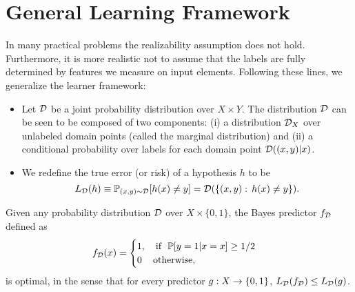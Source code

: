 \documentclass[11pt,a4paper]{article}
\begin{document}
\section{General Learning Framework}

In many practical problems the realizability assumption does not hold. Furthermore, it is more realistic not to assume that the labels are fully determined by features we measure on input elements. Following these lines, we generalize the learner framework:

\begin{itemize}
\item {} Let $\mathcal{D}$ be a joint probability distribution over $X\times Y$. The distribution $\mathcal{D}$ can be seen to be composed of two components: (i) a distribution $\mathcal{D}_X$ over unlabeled domain points (called the marginal distribution) and (ii) a conditional probability over labels for each domain point $\mathcal{D}((x,y)|x)$.

\item {} We redefine the true error (or risk) of a hypothesis $h$ to be
\begin{equation*}
L_{\mathcal{D}} (h) \equiv \mathbb{P}_{(x,y)\sim \mathcal{D}}[h(x)\neq y] = \mathcal{D}(\{(x,y):\,h(x)\neq y\}).
\end{equation*}
\end{itemize}

\begin{prop}
Given any probability distribution $\mathcal{D}$ over $X\times\{0,1\}$, the Bayes predictor $f_{\mathcal{D}}$ defined as
\begin{equation*}
f_{\mathcal{D}}(x) = \begin{cases}
1,\quad \text{if }\ \mathbb{P}[y=1|x = x]\ge 1/2\\
0\,\quad \text{otherwise},
\end{cases}
\end{equation*}
is optimal, in the sense that for every predictor $g:X\rightarrow \{0,1\}$, $L_{\mathcal{D}}(f_{\mathcal{D}})\le L_{\mathcal{D}}(g)$.
\end{prop}
\end{document}
